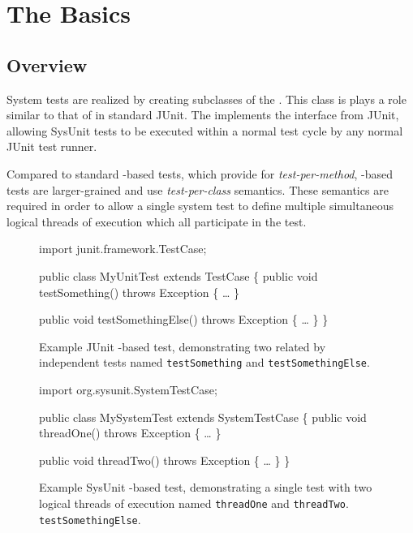 \chapter{The Basics}

\section{Overview}

System tests are realized by creating subclasses of the 
.  This class is plays a role similar
to that of  in standard JUnit.  The
 implements the 
interface from JUnit, allowing SysUnit tests to be executed within
a normal test cycle by any normal JUnit test runner.

Compared to standard -based tests, which
provide for \emph{test-per-method}, -based
tests are larger-grained and use \emph{test-per-class} semantics.
These semantics are required in order to allow a single system 
test to define multiple simultaneous logical threads of execution
which all participate in the test.

\begin{figure}
\begin{codelisting}
import junit.framework.TestCase;

public class MyUnitTest 
    extends TestCase
\{
    public void testSomething() 
        throws Exception 
    \{
        \dots
    \}

    public void testSomethingElse() 
        throws Exception 
    \{
        \dots
    \}
\}
\end{codelisting}
\caption[JUnit \texttt{testXXX()} example]{Example JUnit -based test, demonstrating
two related by independent tests named \texttt{testSomething} and
\texttt{testSomethingElse}.}
\end{figure}

\begin{figure}
\begin{codelisting}
import org.sysunit.SystemTestCase;

public class MySystemTest 
    extends SystemTestCase
\{
    public void threadOne() 
        throws Exception 
    \{
        \dots
    \}

    public void threadTwo() 
        throws Exception 
    \{
        \dots
    \}
\}
\end{codelisting}
\caption{Example SysUnit -based test, demonstrating
a single test with two logical threads of execution named
\texttt{threadOne} and \texttt{threadTwo}.
\texttt{testSomethingElse}.}
\end{figure}

